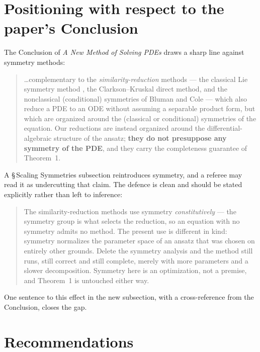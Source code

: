 \documentclass[11pt]{article}
\theoremstyle{plain}
\theoremstyle{definition}
\theoremstyle{remark}
\begin{document}
\section{Positioning with respect to the paper's Conclusion}
\label{sec:positioning}

The Conclusion of \emph{A New Method of Solving PDEs} draws a sharp line
against symmetry methods:

\begin{quote}
\small
\ldots complementary to the \emph{similarity-reduction} methods --- the
classical Lie symmetry method \cite{Olver}, the Clarkson--Kruskal direct method,
and the nonclassical (conditional) symmetries of Bluman and Cole --- which also
reduce a PDE to an ODE without assuming a separable product form, but which are
organized around the (classical or conditional) symmetries of the equation. Our
reductions are instead organized around the differential-algebraic structure of
the ansatz; \textbf{they do not presuppose any symmetry of the PDE}, and they
carry the completeness guarantee of Theorem~1.
\end{quote}

A \S\,Scaling Symmetries subsection reintroduces symmetry, and a referee may
read it as undercutting that claim. The defence is clean and should be stated
explicitly rather than left to inference:

\begin{quote}
The similarity-reduction methods use symmetry \emph{constitutively} --- the
symmetry group is what selects the reduction, so an equation with no symmetry
admits no method. The present use is different in kind: symmetry normalizes the
parameter space of an ansatz that was chosen on entirely other grounds. Delete
the symmetry analysis and the method still runs, still correct and still
complete, merely with more parameters and a slower decomposition. Symmetry here
is an optimization, not a premise, and Theorem~1 is untouched either way.
\end{quote}

One sentence to this effect in the new subsection, with a cross-reference from
the Conclusion, closes the gap.

\section{Recommendations}
\label{sec:recommendations}
\end{document}
